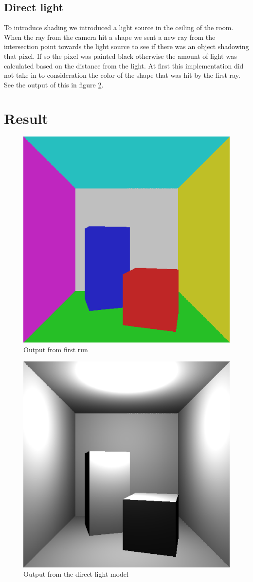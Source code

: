 \documentclass[a4paper,11pt]{article}
\begin{document}
\subsection{Direct light}
To introduce shading we introduced a light source in the ceiling of the room. When the ray from the camera hit a shape we sent a new ray from the intersection point towards the light source to see if there was an object shadowing that pixel. If so the pixel was painted black otherwise the amount of light was calculated based on the distance from the light. At first this implementation did not take in to consideration the color of the shape that was hit by the first ray. See the output of this in figure \ref{fig2}.  
\section{Result}

\begin{figure}[h!]
	\centering
	\includegraphics[width=0.75\linewidth]{screenshot1.png}
	\caption{Output from first run}
	\label{fig1}
\end{figure}

\begin{figure}[h!]
	\centering
	\includegraphics[width=0.75\linewidth]{screenshot2.png}
	\caption{Output from the direct light model}
	\label{fig2}
\end{figure}
\end{document}
